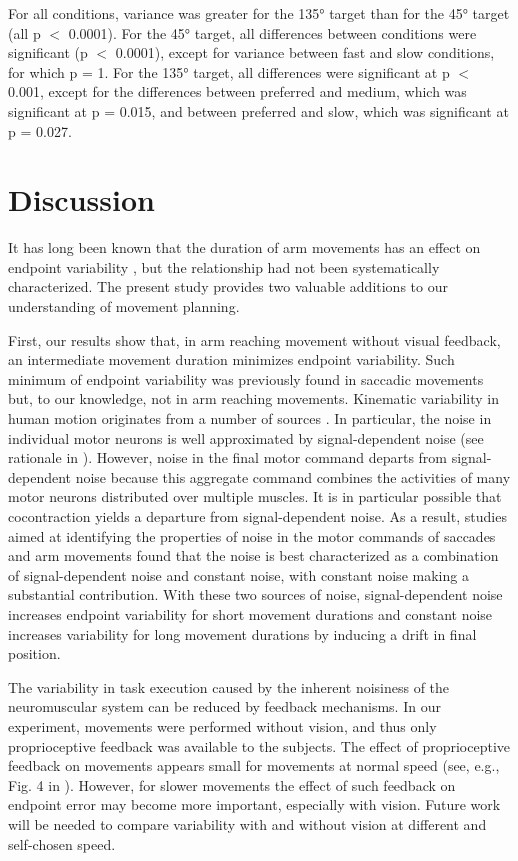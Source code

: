 For all conditions, variance was greater for the \ang{135} target
than for the \ang{45} target (all p $<$ 0.0001). For the \ang{45} target, all differences between conditions were significant (p $<$ 0.0001), except for variance between fast and slow conditions, for which p = 1. For the \ang{135} target, all differences were significant at p $<$ 0.001, except for the differences between preferred and medium, which was significant at p = 0.015, and between preferred and slow, which was significant at p = 0.027.

\section{Discussion}

It has long been known that the duration of arm movements has an effect on endpoint variability \cite{Fitts1954, Woodworth1899}, but the relationship had not been systematically characterized. The present study provides two valuable additions to our understanding of movement planning.

First, our results show that, in arm reaching movement without visual feedback, an intermediate movement duration minimizes endpoint variability. Such minimum of endpoint variability was previously found in saccadic movements \cite{VanBeers2008} but, to our knowledge, not in arm reaching movements. Kinematic variability in human motion originates from a number of sources \cite{Faisal2008}. In particular, the noise in individual motor neurons is well approximated by signal-dependent noise (see rationale in \cite{Harris1998}). However, noise in the final motor command departs from signal-dependent noise because this aggregate command combines the activities of many motor neurons distributed over multiple muscles. It is in particular possible that cocontraction yields a departure from signal-dependent noise. As a result, studies aimed at identifying the properties of noise in the motor commands of saccades \cite{VanBeers2007} and arm movements \cite{VanBeers2004} found that the noise is best characterized as a combination of signal-dependent noise and constant noise, with constant noise making a substantial contribution. With these two sources of noise, signal-dependent noise increases endpoint variability for short movement durations and constant noise increases variability for long movement durations by inducing a drift in final position.

The variability in task execution caused by the inherent noisiness of the neuromuscular system can be reduced by feedback mechanisms. In our experiment, movements were performed without vision, and thus only proprioceptive feedback was available to the subjects. 
The effect of proprioceptive feedback on movements appears small for movements at normal speed (see, e.g., Fig. 4 in \cite{Franklin2007}). However, for slower movements the effect of such feedback on endpoint error may become more important, especially with vision. Future work will be needed to compare variability with and without vision at different and self-chosen speed.

